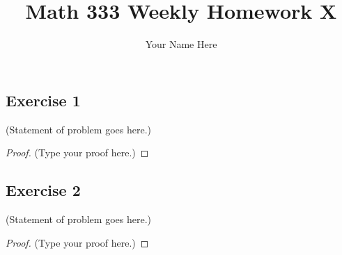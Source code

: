 \documentclass[12pt]{article}
\title{Math 333 Weekly Homework X}
\author{Your Name Here}
\begin{document}
\maketitle

\vspace{0.5in}



\subsection*{Exercise 1}
(Statement of problem goes here.)\\

\begin{proof}
(Type your proof here.)
\end{proof}

\vspace{2in} %


\subsection*{Exercise 2}
(Statement of problem goes here.)\\

\begin{proof}
(Type your proof here.)
\end{proof}

\vspace{2in} %
\end{document}

